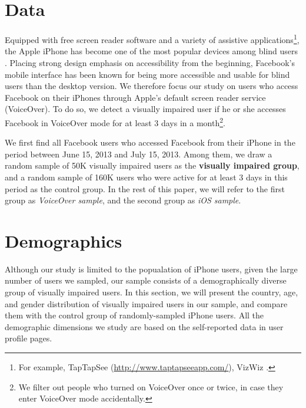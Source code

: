 \documentclass{sigchi}
\begin{document}


\section{Data}

Equipped with free screen reader software and  a variety of assistive applications\footnote{For example, TapTapSee (\url{http://www.taptapseeapp.com/}), VizWiz \cite{jayant2011}.}, the Apple iPhone has become one of the most popular devices among blind users \cite{brady2013chi}.  Placing strong design emphasis on accessibility from the beginning, Facebook's mobile interface has been known for being more accessible and usable for blind users than the desktop version\cite{wentz2011}.   We therefore focus our study on users who access Facebook on their iPhones through Apple's default screen reader service (VoiceOver). To do so, we detect a visually impaired user if he or she accesses Facebook in VoiceOver mode for at least 3 days in a month\footnote{We filter out people who turned on VoiceOver once or twice, in case they enter VoiceOver mode accidentally.}.  

We first find all Facebook users who accessed Facebook from their iPhone in the period between June 15, 2013 and July 15, 2013. Among them, we draw a random sample of 50K visually impaired users as the \textbf{visually impaired group},  and a random sample of 160K users who were active for at least 3 days in this period as the {control group}. In the rest of this paper, we will refer to the first group as \textit{VoiceOver sample}, and the second group as \textit{iOS sample}.


\section{Demographics}
Although our study is limited to the popualation of iPhone users, given the large number of users we sampled, our sample consists of a demographically diverse group of visually impaired users. In this section, we will present the country, age, and gender distribution of visually impaired users in our sample, and compare them with the control group of randomly-sampled iPhone users. All the demographic dimensions we study are based on the self-reported data in user profile pages.
\end{document}

